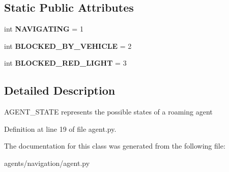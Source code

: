 \subsection*{Static Public Attributes}
\begin{DoxyCompactItemize}
\item 
\mbox{\label{classscripts_1_1agents_1_1navigation_1_1agent_1_1AgentState_a3321c6caf55a1de76918ed9f4dbebb6a}} 
int {\bfseries N\+A\+V\+I\+G\+A\+T\+I\+NG} = 1
\item 
\mbox{\label{classscripts_1_1agents_1_1navigation_1_1agent_1_1AgentState_a1f7326a0dca7607a98705a55d56ffd4c}} 
int {\bfseries B\+L\+O\+C\+K\+E\+D\+\_\+\+B\+Y\+\_\+\+V\+E\+H\+I\+C\+LE} = 2
\item 
\mbox{\label{classscripts_1_1agents_1_1navigation_1_1agent_1_1AgentState_ac2885971cbdb0fc594f7686ac5c49804}} 
int {\bfseries B\+L\+O\+C\+K\+E\+D\+\_\+\+R\+E\+D\+\_\+\+L\+I\+G\+HT} = 3
\end{DoxyCompactItemize}


\subsection{Detailed Description}
\begin{DoxyVerb}AGENT_STATE represents the possible states of a roaming agent
\end{DoxyVerb}
 

Definition at line 19 of file agent.\+py.



The documentation for this class was generated from the following file\+:\begin{DoxyCompactItemize}
\item 
agents/navigation/agent.\+py\end{DoxyCompactItemize}
